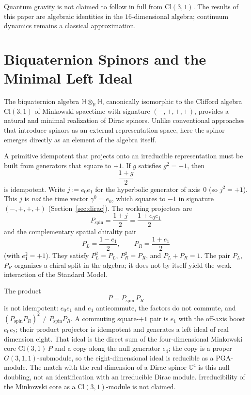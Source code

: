 \documentclass[a4paper]{article}
\begin{document}
Quantum gravity is not claimed to follow in full from $\mathrm{Cl}(3,1)$. The results of this paper are algebraic identities in the $16$-dimensional algebra; continuum dynamics remains a classical approximation.

\section{Biquaternion Spinors and the Minimal Left Ideal}
\label{sec:spinor}

The biquaternion algebra $\mathbb{H}\otimes_{\mathbb{R}}\mathbb{H}$, canonically isomorphic to the Clifford algebra $\mathrm{Cl}(3,1)$ of Minkowski spacetime with signature $(-,+,+,+)$, provides a natural and minimal realization of Dirac spinors. Unlike conventional approaches that introduce spinors as an external representation space, here the spinor emerges directly as an element of the algebra itself.

A primitive idempotent that projects onto an irreducible representation must be built from generators that square to $+1$. If $g$ satisfies $g^2=+1$, then
\[
\frac{1+g}{2}
\]
is idempotent. Write $j:=e_0 e_1$ for the hyperbolic generator of axis~$0$ (so $j^2=+1$). This $j$ is \emph{not} the time vector $\gamma^0=e_0$, which squares to $-1$ in signature $(-,+,+,+)$ (Section~\ref{sec:dirac}). The working projectors are
\[
P_{\mathrm{spin}} = \frac{1+j}{2}=\frac{1+e_0 e_1}{2}
\]
and the complementary spatial chirality pair
\[
P_L = \frac{1-e_1}{2},\qquad P_R = \frac{1+e_1}{2}
\]
(with $e_1^2=+1$). They satisfy $P_L^2=P_L$, $P_R^2=P_R$, and $P_L+P_R=1$. The pair $P_L$, $P_R$ organizes a chiral split in the algebra; it does not by itself yield the weak interaction of the Standard Model.

The product
\[
P = P_{\mathrm{spin}}\, P_R
\]
is not idempotent: $e_0 e_1$ and $e_1$ anticommute, the factors do not commute, and $(P_{\mathrm{spin}}P_R)^2\neq P_{\mathrm{spin}}P_R$. A commuting square-$+1$ pair is $e_1$ with the off-axis boost $e_0 e_2$; their product projector is idempotent and generates a left ideal of real dimension eight. That ideal is the direct sum of the four-dimensional Minkowski core $\mathrm{Cl}(3,1)\,P$ and a copy along the null generator $e_4$; the copy is a proper $G(3,1,1)$-submodule, so the eight-dimensional ideal is reducible as a PGA-module. The match with the real dimension of a Dirac spinor $\mathbb{C}^4$ is this null doubling, not an identification with an irreducible Dirac module. Irreducibility of the Minkowski core as a $\mathrm{Cl}(3,1)$-module is not claimed.
\end{document}
